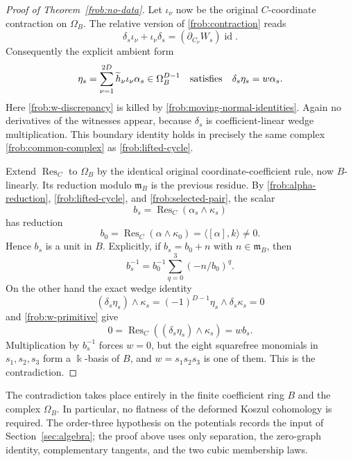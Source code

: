 \begin{proof}[Proof of Theorem~\ref{frob:no-data}]
Let $\iota_\nu$ now be the original $C$-coordinate contraction on
$\Omega_B$.  The relative version of \eqref{frob:contraction} reads
\[
 \delta_s\iota_\nu+\iota_\nu\delta_s
                         =(\partial_{C_\nu}W_s)\operatorname{id}.
\]
Consequently the explicit ambient form
\begin{equation}
 \eta_s=\sum_{\nu=1}^{2D}\widetilde h_\nu\iota_\nu\alpha_s
                  \in\Omega_B^{D-1}
 \quad\hbox{satisfies}\quad
                          \delta_s\eta_s=w\alpha_s.
 \label{frob:w-primitive}
\end{equation}
Here \eqref{frob:w-discrepancy} is killed by
\eqref{frob:moving-normal-identities}.  Again no derivatives of the
witnesses appear, because $\delta_s$ is coefficient-linear wedge
multiplication.  This boundary identity holds in precisely the same
complex \eqref{frob:common-complex} as \eqref{frob:lifted-cycle}.

Extend $\operatorname{Res}_C$ to $\Omega_B$ by the identical original
coordinate-coefficient rule, now $B$-linearly.  Its reduction modulo
$\mathfrak m_B$ is the previous residue.  By
\eqref{frob:alpha-reduction}, \eqref{frob:lifted-cycle}, and
\eqref{frob:selected-pair}, the scalar
\[
                 b_s=\operatorname{Res}_C(\alpha_s\wedge\kappa_s)
\]
has reduction
\begin{equation}
 b_0=\operatorname{Res}_C(\alpha\wedge\kappa_0)
                         =\langle[\alpha],k\rangle\ne0.
 \label{frob:unit-reduction}
\end{equation}
Hence $b_s$ is a unit in $B$.  Explicitly, if $b_s=b_0+n$ with
$n\in\mathfrak m_B$, then
\[
                b_s^{-1}=b_0^{-1}\sum_{q=0}^3(-n/b_0)^q.
\]
On the other hand the exact wedge identity
\[
 (\delta_s\eta_s)\wedge\kappa_s
              =(-1)^{D-1}\eta_s\wedge\delta_s\kappa_s=0
\]
and \eqref{frob:w-primitive} give
\[
                  0=\operatorname{Res}_C((\delta_s\eta_s)\wedge\kappa_s)
                    =w b_s.
\]
Multiplication by $b_s^{-1}$ forces $w=0$, but the eight squarefree
monomials in $s_1,s_2,s_3$ form a $\Bbbk$-basis of $B$, and
$w=s_1s_2s_3$ is one of them.  This is the contradiction.

\end{proof}

The contradiction takes place entirely in the finite coefficient ring
$B$ and the complex $\Omega_B$. In particular, no flatness of the
deformed Koszul cohomology is required. The order-three hypothesis on
the potentials records the input of Section~\ref{sec:algebra}; the
proof above uses only separation, the zero-graph identity,
complementary tangents, and the two cubic membership laws.
